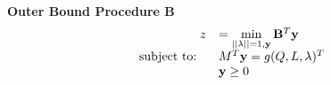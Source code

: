\textbf{Outer Bound Procedure B} 
\begin{equation}\label{eq:OPTfeasOutRelaxb}
\begin{array}{rl}
\ z &=\min\limits_{||\lambda||=1, \mathbf{y}}\mathbf{B}^T\mathbf{y}  \\
 \text{subject to: } \ & M^T\mathbf{y} = g(Q,L,\lambda)^T \\
 & \mathbf{y}\geq 0
\end{array}
\end{equation}










